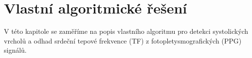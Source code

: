 \chapter{Vlastní algoritmické řešení}
\label{ch:VlastniAlg}

V této kapitole se zaměříme na popis vlastního algoritmu pro detekci systolických vrcholů a odhad srdeční tepové frekvence (\acs{TF}) z fotopletysmografických (\acs{PPG}) signálů.